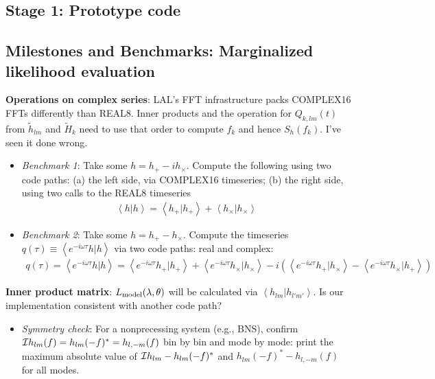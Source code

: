 \documentclass[twocolumn,prd,nofootinbib]{revtex4}
\newcommand\qmstateproduct[2]{\left\langle#1|#2\right\rangle}
\begin{document}
\begin{widetext}
\section{Stage 1: Prototype code}
\subsection{Milestones and Benchmarks: Marginalized likelihood evaluation}

\noindent \textbf{Operations on complex series}: LAL's FFT infrastructure packs COMPLEX16 FFTs differently than REAL8.
Inner products and the operation for $Q_{k,lm}(t)$ from $\tilde{h}_{lm}$ and $\tilde{H}_k$ need to use that order to
compute $f_k$ and hence $S_h(f_k)$.  I've seen it done wrong.
\begin{itemize}
\item  \emph{Benchmark 1}: Take some $h=h_+-ih_\times$.  Compute the following using two code paths: (a) the left side,
  via COMPLEX16 timeseries; (b) the right side, using two calls to the REAL8 timeseries
\begin{eqnarray}
\qmstateproduct{h}{h}=\qmstateproduct{h_+}{h_+}+\qmstateproduct{h_\times}{h_\times}
\end{eqnarray}
\item \emph{Benchmark 2}: Take some $h=h_+-h_\times$.  Compute the timeseries $q(\tau)\equiv \qmstateproduct{e^{-i\omega
    \tau}h}{h}$ via two code paths: real and complex:
\begin{eqnarray}
q(\tau) = \qmstateproduct{e^{-i\omega \tau} h}{h} = 
\qmstateproduct{e^{-i\omega \tau}h_+}{h_+} + \qmstateproduct{e^{-i\omega \tau}h_\times}{h_\times}
-i(\qmstateproduct{e^{-i\omega \tau}h_+}{h_\times} - \qmstateproduct{e^{-i\omega \tau}h_\times}{h_+})
\end{eqnarray}
\end{itemize}

\noindent \textbf{Inner product matrix}: $L_{\rm model}(\lambda,\theta)$ will be calculated via
$\qmstateproduct{h_{lm}}{h_{l'm'}}$.  Is our implementation consistent with another code path?
\begin{itemize}
\item \emph{Symmetry check}:  For a nonprecessing system (e.g., BNS), confirm ${\cal I}h_{lm}(f) =
  h_{lm}(-f)^*=h_{l,-m}(f)$ bin by bin and mode by mode: print the maximum absolute value of ${\cal I}h_{lm}  -
  h_{lm}(-f)^*$ and $h_{lm}(-f)^* - h_{l,-m}(f)$ for all modes.


\end{itemize}
\end{widetext}
\end{document}
